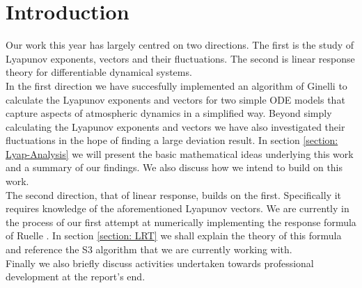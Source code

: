 \section{Introduction}

Our work this year has largely centred on two directions. The first is the study of Lyapunov exponents, vectors and their fluctuations. The second is linear response theory for differentiable dynamical systems.\\

In the first direction we have succesfully implemented an algorithm of Ginelli \cite{Ginelli2013} to calculate the Lyapunov exponents and vectors for two simple ODE models that capture aspects of atmospheric dynamics in a simplified way. Beyond simply calculating the Lyapunov exponents and vectors we have also investigated their fluctuations in the hope of finding a large deviation result. In section \ref{section: Lyap-Analysis} we will present the basic mathematical ideas underlying this work and a summary of our findings. We also discuss how we intend to build on this work.\\

The second direction, that of linear response, builds on the first. Specifically it requires knowledge of the aforementioned Lyapunov vectors. We are currently in the process of our first attempt at numerically implementing the response formula of Ruelle \cite{Ruelle2009}. In section \ref{section: LRT} we shall explain the theory of this formula and reference the S3 algorithm \cite{Chandramoorthy2020} that we are currently working with.\\

Finally we also briefly discuss activities undertaken towards professional development at the report's end.



